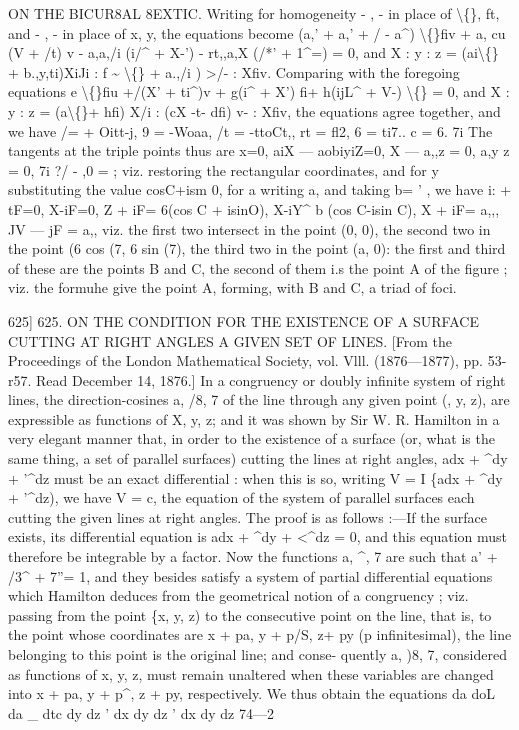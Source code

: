 \documentclass[12pt,a4paper]{article}
\begin{document}
ON THE BICUR8AL 8EXTIC.
Writing
for
homogeneity -
,
-
in
place
of
\textbackslash\{\},
ft,
and
-
,
-
in
place
of
x,
y,
the
equations become
(a,' + a,' + \guillemotleft{}/ - a\textasciicircum{}) \textbackslash\{\}fiv + a, cu (V + /t\guillemotright{}) v - a,a,/i (i/\textasciicircum{} + X-') - rt,,a,X (/*' +
1\textasciicircum{}=) = 0,
and
X
: y
: z = (ai\textbackslash\{\} + b.,y,ti)XiJi
:
f \textasciitilde{} \textbackslash\{\} + a.,/i
)
>/-
:
Xfiv.
Comparing with the foregoing equations
e \textbackslash\{\}fiu +/(X' + ti\textasciicircum{})v + g(i\textasciicircum{} + X') fi+ h(ijL\textasciicircum{} + V-) \textbackslash\{\} = 0,
and
X
: y
: z = (a\textbackslash\{\}+ hfi) X/i
: (cX
-t- dfi) v-
:
Xfiv,
the equations agree together, and we
have
/= + Oitt-j,
9 = -Woaa,
/t = -ttoCt,,
rt =
fl2,
6 =
ti7..
c =
6.
7i
The tangents at the
triple points thus are
x=0,
aiX --- aobiyiZ=0,
X --- a,,z = 0,
a,y
z = 0,
7i
?/ - \guillemotleft{},0 =
;
viz. restoring
the rectangular coordinates, and
for y
substituting the
value cosC+ism 0,
for
a\guillemotleft{} writing
a, and taking b=
'
, we have
i: + tF=0,
X-iF=0,
Z + iF= 6(cos C + isinO),
X-iY\textasciicircum{} b (cos C-isin C),
X + iF= a,,,
JV --- jF = a,,
viz.
the
first two
intersect
in
the
point
(0,
0),
the
second
two
in
the
point
(6 cos (7,
6 sin (7),
the
third
two
in
the
point
(a,
0):
the
first
and
third
of these
are
the points
B
and
C,
the
second
of
them
i.s
the
point A
of
the
figure
;
viz.
the
formuhe
give
the point A, forming, with B and
C, a
triad of
foci.

625]
625.
ON
THE
CONDITION
FOR THE
EXISTENCE
OF A SURFACE
CUTTING AT RIGHT ANGLES A GIVEN SET OF LINES.
[From
the Proceedings of the London Mathematical
Society,
vol.
Vlll. (1876---1877),
pp. 53-r57.
Read December
14,
1876.]
In
a
congruency
or
doubly
infinite
system
of
right
lines,
the
direction-cosines
a,
/8,
7
of
the
line
through
any
given
point
(\guillemotleft{},
y,
z),
are
expressible
as
functions
of
X,
y,
z;
and
it
was
shown
by
Sir W.
R.
Hamilton
in
a
very
elegant
manner
that,
in
order
to
the
existence
of
a
surface
(or,
what
is
the
same
thing,
a
set
of
parallel
surfaces)
cutting
the
lines
at
right
angles,
adx + \textasciicircum{}dy + '\textasciicircum{}dz
must
be
an exact
differential
:
when
this
is
so,
writing
V =
I \{adx + \textasciicircum{}dy + '\textasciicircum{}dz),
we
have
V = c,
the
equation of the system
of parallel surfaces each
cutting the given
lines
at right
angles.
The
proof
is
as
follows
:---If
the
surface
exists,
its
differential
equation
is
adx + \textasciicircum{}dy + <\textasciicircum{}dz = 0,
and
this
equation
must
therefore
be
integrable
by
a
factor.
Now
the
functions
a,
\textasciicircum{},
7
are
such
that
a' + /3\textasciicircum{} + 7''= 1,
and
they
besides
satisfy
a
system
of
partial
differential
equations
which
Hamilton
deduces
from
the
geometrical
notion
of
a
congruency
;
viz.
passing
from
the
point
\{x,
y,
z)
to
the
consecutive
point
on
the
line,
that
is,
to
the
point
whose
coordinates
are
x + pa,
y + p/S, z+ py
(p
infinitesimal),
the
line
belonging
to
this
point
is
the
original
line;
and
conse-
quently
a,
)8,
7, considered
as
functions
of
x,
y,
z,
must
remain
unaltered
when
these
variables
are
changed
into
x + pa,
y + p\textasciicircum{},
z + py,
respectively.
We
thus
obtain
the
equations
da
doL
da \_
dtc
dy
dz
'
dx
dy
dz
'
dx
dy
dz
74---2
\end{document}
